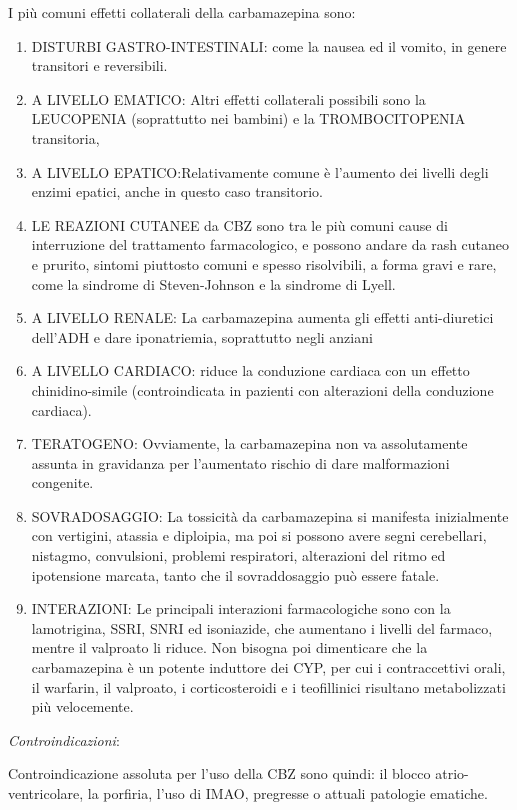 \documentclass[]{article}
\begin{document}
I più comuni effetti collaterali della carbamazepina sono:

\begin{enumerate}
\def\labelenumi{\arabic{enumi}.}
\item
  DISTURBI GASTRO-INTESTINALI: come la nausea ed il vomito, in genere
  transitori e reversibili.
\item
  A LIVELLO EMATICO: Altri effetti collaterali possibili sono la
  LEUCOPENIA (soprattutto nei bambini) e la TROMBOCITOPENIA transitoria,
\item
  A LIVELLO EPATICO:Relativamente comune è l'aumento dei livelli degli
  enzimi epatici, anche in questo caso transitorio.
\item
  LE REAZIONI CUTANEE da CBZ sono tra le più comuni cause di
  interruzione del trattamento farmacologico, e possono andare da rash
  cutaneo e prurito, sintomi piuttosto comuni e spesso risolvibili, a
  forma gravi e rare, come la sindrome di Steven-Johnson e la sindrome
  di Lyell.
\item
  A LIVELLO RENALE: La carbamazepina aumenta gli effetti anti-diuretici
  dell'ADH e dare iponatriemia, soprattutto negli anziani
\item
  A LIVELLO CARDIACO: riduce la conduzione cardiaca con un effetto
  chinidino-simile (controindicata in pazienti con alterazioni della
  conduzione cardiaca).
\item
  TERATOGENO: Ovviamente, la carbamazepina non va assolutamente assunta
  in gravidanza per l'aumentato rischio di dare malformazioni congenite.
\item
  SOVRADOSAGGIO: La tossicità da carbamazepina si manifesta inizialmente
  con vertigini, atassia e diploipia, ma poi si possono avere segni
  cerebellari, nistagmo, convulsioni, problemi respiratori, alterazioni
  del ritmo ed ipotensione marcata, tanto che il sovraddosaggio può
  essere fatale.
\item
  INTERAZIONI: Le principali interazioni farmacologiche sono con la
  lamotrigina, SSRI, SNRI ed isoniazide, che aumentano i livelli del
  farmaco, mentre il valproato li riduce. Non bisogna poi dimenticare
  che la carbamazepina è un potente induttore dei CYP, per cui i
  contraccettivi orali, il warfarin, il valproato, i corticosteroidi e i
  teofillinici risultano metabolizzati più velocemente.
\end{enumerate}

\emph{\emph{Controindicazioni}}:

Controindicazione assoluta per l'uso della CBZ sono quindi: il blocco
atrio-ventricolare, la porfiria, l'uso di IMAO, pregresse o attuali
patologie ematiche.
\end{document}
